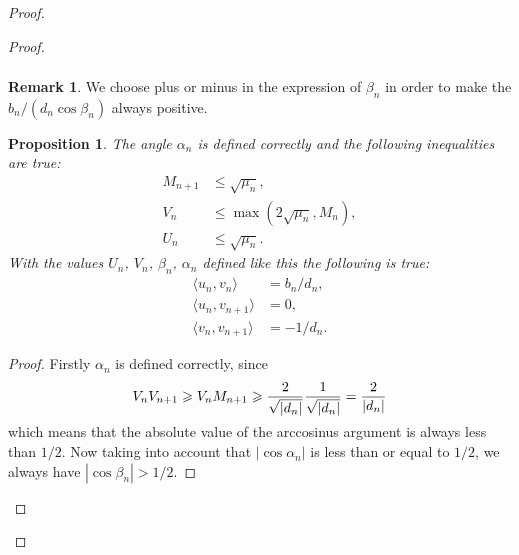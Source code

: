 \documentclass[12pt]{article}
\newcommand\inner[2]{\langle #1, #2 \rangle}
\renewcommand{\leq}{\leqslant}
\renewcommand{\geq}{\geqslant}
\newtheorem{prop}{Proposition}
\theoremstyle{definition}
\newtheorem*{remark*}{Remark}
\numberwithin{remark}{section}
\numberwithin{theorem}{section}
\numberwithin{prop}{section}
\numberwithin{equation}{section}
\numberwithin{lemma}{section}
\numberwithin{prop_under_lemma}{lemma}
\begin{document}
\begin{proof}
\begin{proof}
\begin{align*}
                \end{align*}
                \begin{remark*}
                    We choose plus or minus in the expression of $\beta_n$ in order to make the $b_n/(d_n \cos{\beta_n})$ always positive.
                \end{remark*}
                \begin{prop}
                    The angle $\alpha_n$ is defined correctly and the following inequalities are true:
                    \begin{align*}
                        M_{n+1} &\leq \sqrt{\mu_n},\\
                        V_n &\leq \max(2\sqrt{\mu_n}, M_n),\\
                        U_n &\leq \sqrt{\mu_n}.
                    \end{align*}
                    With the values $U_n$, $V_n$, $\beta_n$, $\alpha_n$ defined like this the following is true:
                    \begin{align*}
                        \inner{u_n}{v_n} &= b_n/d_n,\\
                        \inner{u_n}{v_{n+1}} &= 0,\\
                        \inner{v_n}{v_{n+1}} &= -1/d_n.
                    \end{align*}
                \end{prop}
                \begin{proof}
                    Firstly $\alpha_n$ is defined correctly, since
                    $$
                    V_n V_{n+1} \geq V_n M_{n+1} \geq \frac{2}{\sqrt{\smash[b]{|d_n|}}} \frac{1}{\sqrt{\smash[b]{|d_n|}}}
                     = \frac{2}{|d_n|}
                    $$
                    which means that the absolute value of the arccosinus argument is always less than $1/2$. Now taking into
                    account that $|\cos{\alpha_n}|$ is less than or equal to $1/2$, we always have $|\cos{\beta_n}| > 1/2$.
                    

\end{proof}
\end{proof}
\end{proof}
\end{document}
